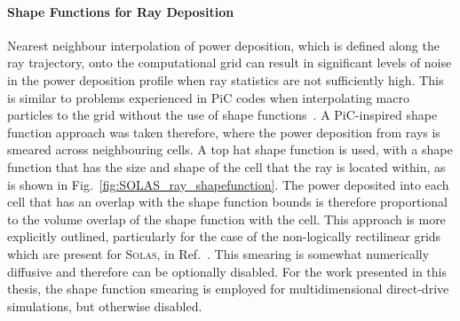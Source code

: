 \paragraph*{Shape Functions for Ray Deposition}
Nearest neighbour interpolation of power deposition, which is defined along the ray trajectory, onto the computational grid can result in significant levels of noise in the power deposition profile when ray statistics are not sufficiently high.
This is similar to problems experienced in \ac{PiC} codes when interpolating macro particles to the grid without the use of shape functions~\cite{birdsall_plasma_1985,arber_contemporary_2015}.
A \ac{PiC}-inspired shape function approach was taken therefore, where the power deposition from rays is smeared across neighbouring cells.
A top hat shape function is used, with a shape function that has the size and shape of the cell that the ray is located within, as is shown in Fig.~\ref{fig:SOLAS_ray_shapefunction}.
The power deposited into each cell that has an overlap with the shape function bounds is therefore proportional to the volume overlap of the shape function with the cell.
This approach is more explicitly outlined, particularly for the case of the non-logically rectilinear grids which are present for \textsc{Solas}, in Ref.~\cite{cornet_new_2007}.
This smearing is somewhat numerically diffusive and therefore can be optionally disabled.
For the work presented in this thesis, the shape function smearing is employed for multidimensional direct-drive simulations, but otherwise disabled.

